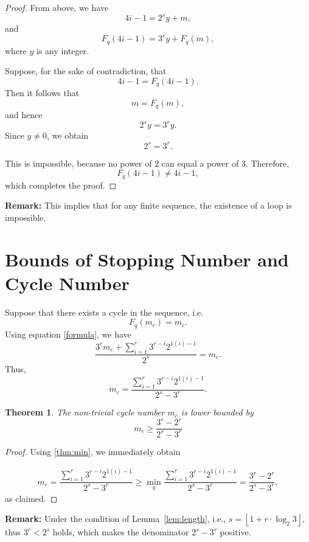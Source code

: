 \documentclass{amsart}
\newtheorem{theorem}{Theorem}[section]
\theoremstyle{definition}
\theoremstyle{remark}
\numberwithin{equation}{section}
\begin{document}
\begin{proof}
	From above, we have
	\[
	4i - 1 = 2^{s} y + m,
	\]
	and
	\[
	F_q(4i - 1) = 3^{r} y + F_q(m),
	\]
	where $y$ is any integer.
	
	Suppose, for the sake of contradiction, that
	\[
	4i - 1 = F_q(4i - 1).
	\]
	Then it follows that
	\[
	m = F_q(m),
	\]
	and hence
	\[
	2^{s} y = 3^{r} y.
	\]
	Since $y \neq 0$, we obtain
	\[
	2^{s} = 3^{r}.
	\]
	
	This is impossible, because no power of $2$ can equal a power of $3$. Therefore,
	\[
	F_q(4i - 1) \neq 4i - 1,
	\]
	which completes the proof.
\end{proof}

\textbf{Remark:} This implies that for any finite sequence, the existence of a loop is impossible.



\section{Bounds of Stopping Number and Cycle Number}


Suppose that there exists a cycle in the sequence, i.e. $$F_q (m_c )=m_c.$$ Using equation \eqref{formula}, we have $$\dfrac{3^rm_c+\sum_{i=1}^r3^{r-i} 2^{1(i)-1}}{2^s}=m_c.$$
Thus, 
\begin{equation*}
	m_c=\dfrac{\sum_{i=1}^r3^{r-i} 2^{1(i)-1}}{2^s-3^r}.
\end{equation*}

\begin{theorem}\label{thm:mc_low}
	The non-trivial cycle number $m_c$ is lower bounded by
	$$ \boxed {m_c\geq\dfrac{3^{r}-2^{r}}{2^s-3^r} }$$
\end{theorem}

\begin{proof}
Using \autoref{thm:min}, we immediately obtain

\begin{align*}
m_c=\dfrac{\sum_{i=1}^r3^{r-i} 2^{1(i)-1}}{2^s-3^r}\geq\min_{q} \dfrac{\sum_{i=1}^r3^{r-i} 2^{1(i)-1}}{2^s-3^r}
=\dfrac{3^{r}-2^{r}}{2^s-3^r}, 
\end{align*}
as claimed.

\end{proof}

\textbf{Remark:} Under the condition of Lemma~\ref{lem:length}, i.e., $ s = \left\lfloor 1 + r \cdot \log_2 3 \right\rfloor$, thus  $3^r<2^s$ holds, which makes the denominator $2^s-3^r$ positive.
\end{document}
